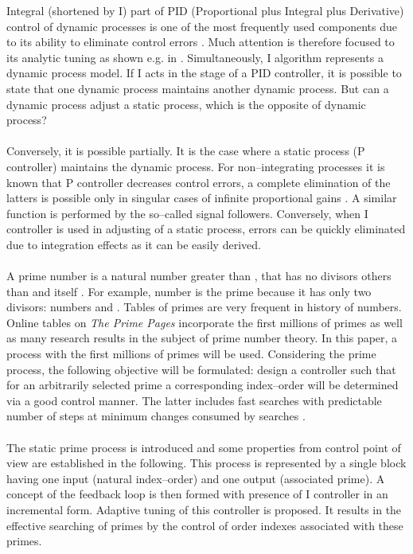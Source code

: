 \documentclass[12pt,a4paper,twoside]{article}
\begin{document}
\vspace{0.3cm}\noindent Integral (shortened by I) part of PID (Proportional plus Integral plus Derivative) control of dynamic processes is one of the most frequently used components due to its ability to eliminate control errors \cite{sem}. Much attention is therefore focused to its analytic tuning  as shown e.g. in \cite{odw}. Simultaneously, I algorithm represents a dynamic process model. If I acts in the stage of a PID controller, it is possible to state that one dynamic process maintains another dynamic process. But can a dynamic process adjust a static process, which is the opposite of dynamic process?\\
\\
Conversely, it is possible partially. It is the case where a static process (P controller) maintains the dynamic process. For non--integrating processes it is known that P controller decreases control errors, a complete elimination of the latters is possible only in singular cases of infinite proportional gains \cite{kg1}. A similar function is performed by the so--called signal followers. Conversely, when I controller is used in adjusting of a static process, errors can be quickly eliminated due to integration effects as it can be easily derived.\\   
\\
A prime number is a natural number greater than , that has no divisors others than  and itself \cite{cogu}. For example, number  is the prime because it has only two divisors: numbers  and . Tables of primes are very frequent in history of numbers. Online tables on {\it The Prime Pages} incorporate the first  millions of primes as well as many research results in the subject of prime number theory. In this paper, a process with the first  millions of primes will be used. Considering the prime process, the following objective will be formulated: design a controller such that for an arbitrarily selected prime a corresponding index--order will be determined via a good control manner. The latter includes fast searches with predictable number of steps at minimum changes consumed by searches \cite{mmi}.\\
\\
The static prime process is introduced and some properties from control point of view are established in the following. This process is represented by a single block having one input (natural index--order) and one output (associated prime). A concept of the feedback loop is then formed with presence of I controller in an incremental form. Adaptive tuning of this controller is proposed. It results in the effective searching of primes by the control of order indexes associated with these primes.   
\end{document}
